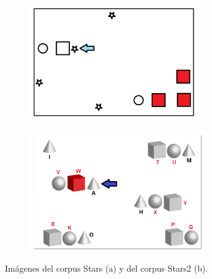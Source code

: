 \begin{figure}[H]
\begin{subfigure}{.5\textwidth}
\centering
\includegraphics[width=\textwidth]{images/STARS.png}\\[0pt]
\caption{}
\label{fig-STARS}
\end{subfigure}
\hspace*{0cm}
\begin{subfigure}{.5\textwidth}

\centering
\includegraphics[width=\textwidth]{images/STARS2.png}\\[0pt]
\caption{}
\label{fig-STARS2}
\end{subfigure}
\caption{Im\'agenes del corpus Stars (a) y del corpus Stars2 (b).}\label{imagenes-stars-stars2}
\end{figure}

